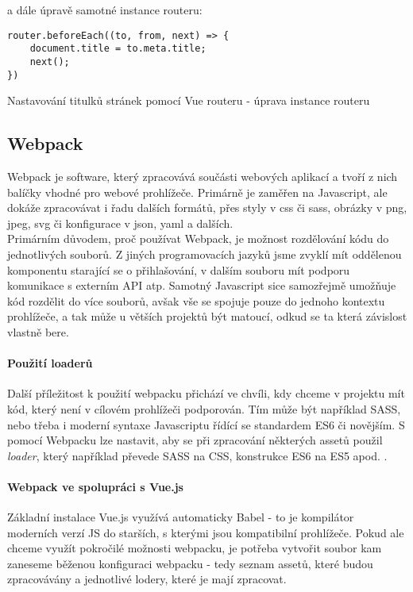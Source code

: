 a dále úpravě samotné instance routeru:

\begin{listing}[H]
    \begin{verbatim}
router.beforeEach((to, from, next) => {
    document.title = to.meta.title;
    next();
})
\end{verbatim}
\caption{Nastavování titulků stránek pomocí Vue routeru - úprava instance routeru} \label{code:vue-router-title2}
\end{listing}

\subsection{Webpack}

Webpack \cite{webpack} je software, který zpracovává součásti webových aplikací a tvoří z nich balíčky vhodné pro webové prohlížeče. Primárně je zaměřen na Javascript, ale dokáže zpracovávat i řadu dalších formátů, přes styly v css či sass, obrázky v png, jpeg, svg či konfigurace v json, yaml a dalších.\\
Primárním důvodem, proč používat Webpack, je možnost rozdělování kódu do jednotlivých souborů. Z jiných programovacích jazyků jsme zvyklí mít oddělenou komponentu starající se o přihlašování, v dalším souboru mít podporu komunikace s externím API atp. Samotný Javascript sice samozřejmě umožňuje kód rozdělit do více souborů, avšak vše se spojuje pouze do jednoho kontextu prohlížeče, a tak může u větších projektů být matoucí, odkud se ta která závislost vlastně bere.

\paragraph{Použití loaderů} Další příležitost k použití webpacku přichází ve chvíli, kdy chceme v projektu mít kód, který není v cílovém prohlížeči podporován. Tím může být například SASS, nebo třeba i moderní syntaxe Javascriptu řídící se standardem ES6 či novějším. S pomocí Webpacku lze nastavit, aby se při zpracování některých assetů použil \emph{loader}, který například převede SASS na CSS, konstrukce ES6 na ES5 apod. \cite{webpack-ackee}.

\paragraph{Webpack ve spolupráci s Vue.js} Základní instalace Vue.js využívá automaticky Babel \cite{babel} - to je kompilátor moderních verzí JS do starších, s kterými jsou kompatibilní prohlížeče. Pokud ale chceme využít pokročilé možnosti webpacku, je potřeba vytvořit soubor  kam zaneseme běženou konfiguraci webpacku - tedy seznam assetů, které budou zpracovávány a jednotlivé lodery, které je mají zpracovat.

